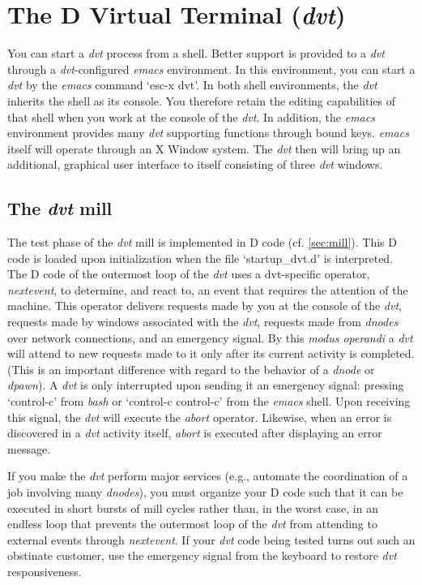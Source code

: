 \newpage


\section{The  D Virtual Terminal (\emph{dvt})}\label{sec:dvt}
You can start a \emph{dvt} process from a shell. Better support is provided to a \emph{dvt} through a \emph{dvt}-configured \emph{emacs} environment. In this environment, you can start a \emph{dvt} by the \emph{emacs} command `esc-x dvt'. In both shell environments, the \emph{dvt} inherits the shell as its console. You therefore retain the editing capabilities of that shell when you work at the console of the \emph{dvt}. In addition, the \emph{emacs} environment provides many \emph{dvt} supporting functions through bound keys. \emph{emacs} itself will operate through an X Window system. The \emph{dvt} then will bring up an additional, graphical user interface to itself consisting of three \emph{dvt} windows.

\subsection{The \emph{dvt} mill}

The test phase of the \emph{dvt} mill is implemented in D code (cf. \ref{sec:mill}). This D code is loaded upon initialization when the file `startup\_dvt.d' is interpreted. The D code of the outermost loop of the \emph{dvt} uses a dvt-specific operator, \emph{nextevent}, to determine, and react to, an event that requires the attention of the machine. This operator delivers requests made by you at the console  of the \emph{dvt}, requests made by windows associated with the \emph{dvt}, requests made from \emph{dnodes} over network connections, and an emergency signal. By this \emph{modus operandi} a \emph{dvt} will attend to new requests made to it only after its current activity is completed. (This is an important difference with regard to the behavior of a \emph{dnode} or \emph{dpawn}). A \emph{dvt} is only interrupted upon sending it an emergency signal: pressing `control-c' from \emph{bash} or `control-c control-c' from the \emph{emacs} shell. Upon receiving this signal, the \emph{dvt} will execute the \emph{abort} operator. Likewise, when an error is discovered in a \emph{dvt} activity itself, \emph{abort} is executed after displaying an error message.

 If you make the \emph{dvt} perform major services (e.g., automate the coordination of a job involving many \emph{dnodes}), you must organize your D code such that it can be executed in short bursts of mill cycles rather than, in the worst case, in an endless loop that prevents the outermost loop of the \emph{dvt} from attending to external events through \emph{nextevent}. If your \emph{dvt} code being tested turns out such an obstinate customer, use the emergency signal from the keyboard to restore \emph{dvt} responsiveness.

